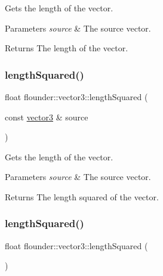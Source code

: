 Gets the length of the vector. 


\begin{DoxyParams}{Parameters}
{\em source} & The source vector. \\
\hline
\end{DoxyParams}
\begin{DoxyReturn}{Returns}
The length of the vector. 
\end{DoxyReturn}
\mbox{\label{classflounder_1_1vector3_aedbc786b7cfa2c647f6f0afb391b722a}} 
\subsubsection{\texorpdfstring{length\+Squared()}{lengthSquared()}\hspace{0.1cm}{\footnotesize\ttfamily [1/2]}}
{\footnotesize\ttfamily float flounder\+::vector3\+::length\+Squared (\begin{DoxyParamCaption}\item[{const \hyperlink{classflounder_1_1vector3}{vector3} \&}]{source }\end{DoxyParamCaption})\hspace{0.3cm}{\ttfamily [static]}}



Gets the length of the vector. 


\begin{DoxyParams}{Parameters}
{\em source} & The source vector. \\
\hline
\end{DoxyParams}
\begin{DoxyReturn}{Returns}
The length squared of the vector. 
\end{DoxyReturn}
\mbox{\label{classflounder_1_1vector3_a72a0449a8695adc7be78d4d04eef1a4c}} 
\subsubsection{\texorpdfstring{length\+Squared()}{lengthSquared()}\hspace{0.1cm}{\footnotesize\ttfamily [2/2]}}
{\footnotesize\ttfamily float flounder\+::vector3\+::length\+Squared (\begin{DoxyParamCaption}{ }\end{DoxyParamCaption})}



